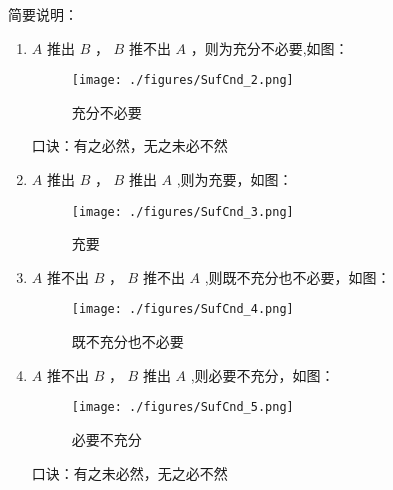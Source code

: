 简要说明：
\begin{enumerate}
有命题 $A$ 和 $B$ 
\item $A$ 推出 $B$ ， $B$ 推不出 $A$ ，则为充分不必要,如图：\begin{figure}[ht]
\centering
\texttt{[image: ./figures/SufCnd\_2.png]}
\caption{充分不必要} \label{SufCnd_fig2}
\end{figure}
口诀：有之必然，无之未必不然
\item $A$ 推出 $B$ ， $B$ 推出 $A$ ,则为充要，如图：\begin{figure}[ht]
\centering
\texttt{[image: ./figures/SufCnd\_3.png]}
\caption{充要} \label{SufCnd_fig3}
\end{figure}
\item $A$ 推不出 $B$ ， $B$ 推不出 $A$ ,则既不充分也不必要，如图：\begin{figure}[ht]
\centering
\texttt{[image: ./figures/SufCnd\_4.png]}
\caption{既不充分也不必要} \label{SufCnd_fig4}
\end{figure}
\item $A$ 推不出 $B$ ， $B$ 推出 $A$ ,则必要不充分，如图：\begin{figure}[ht]
\centering
\texttt{[image: ./figures/SufCnd\_5.png]}
\caption{必要不充分} \label{SufCnd_fig5}
\end{figure}
口诀：有之未必然，无之必不然
\end {enumerate}


